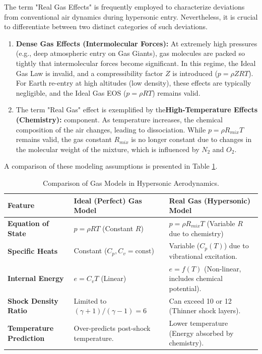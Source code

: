 The term "Real Gas Effects" is frequently employed to characterize deviations from conventional air dynamics during hypersonic entry. Nevertheless, it is crucial to differentiate between two distinct categories of such deviations.

\begin{enumerate}
    \item \textbf{Dense Gas Effects (Intermolecular Forces):} At extremely high pressures (e.g., deep atmospheric entry on Gas Giants), gas molecules are packed so tightly that intermolecular forces become significant. In this regime, the Ideal Gas Law is invalid, and a compressibility factor $Z$ is introduced ($p = \rho Z R T$). For Earth re-entry at high altitudes (low density), these effects are typically negligible, and the Ideal Gas EOS ($p = \rho R T$) remains valid.

    \item The term "Real Gas" effect is exemplified by the\textbf{High-Temperature Effects (Chemistry):} component. As temperature increases, the chemical composition of the air changes, leading to dissociation. While $p = \rho R_{mix} T$ remains valid, the gas constant $R_{mix}$ is no longer constant due to changes in the molecular weight of the mixture, which is influenced by $N_2$ and $O_2$.
\end{enumerate}

A comparison of these modeling assumptions is presented in Table \ref{tab:gas_models}.

\begin{table}[H]
    \centering
    \caption{Comparison of Gas Models in Hypersonic Aerodynamics.}
    \label{tab:gas_models}
    \begin{tabularx}{\textwidth}{|l|X|X|}
        \hline
        \rowcolor{gray!20} \textbf{Feature} & \textbf{Ideal (Perfect) Gas Model} & \textbf{Real Gas (Hypersonic) Model} \\ \hline
        \textbf{Equation of State} & $p = \rho R T$ (Constant $R$) & $p = \rho R_{mix} T$ (Variable $R$ due to chemistry) \\ \hline
        \textbf{Specific Heats} & Constant ($C_p, C_v = \text{const}$) & Variable ($C_p(T)$) due to vibrational excitation. \\ \hline
        \textbf{Internal Energy} & $e = C_v T$ (Linear) & $e = f(T)$ (Non-linear, includes chemical potential). \\ \hline
        \textbf{Shock Density Ratio} & Limited to $(\gamma+1)/(\gamma-1) = 6$ & Can exceed 10 or 12 (Thinner shock layers). \\ \hline
        \textbf{Temperature Prediction} & Over-predicts post-shock temperature. & Lower temperature (Energy absorbed by chemistry). \\ \hline
    \end{tabularx}
\end{table}

